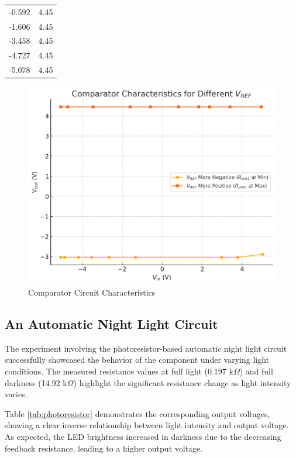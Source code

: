 \documentclass[12pt]{article}
\begin{document}
\begin{table}[H]
\begin{tabular}{|c|c|}
		-0.592       & 4.45                                                        \\
		-1.606       & 4.45                                                        \\
		-3.458       & 4.45                                                        \\
		-4.727       & 4.45                                                        \\
		-5.078       & 4.45                                                        \\
		\hline
	\end{tabular}
	\label{tab:comparator}
\end{table}

\begin{figure}[H]
	\centering
	\includegraphics[width=12cm]{03_exp2}
	\caption{Comparator Circuit Characteristics}
	\label{fig:exp2}
\end{figure}

\subsection{An Automatic Night Light Circuit}
The experiment involving the photoresistor-based automatic night light circuit successfully showcased the behavior of the component under varying light conditions. The measured resistance values at full light (0.197 k$\Omega$) and full darkness (14.92 k$\Omega$) highlight the significant resistance change as light intensity varies.

Table \ref{tab:photoresistor} demonstrates the corresponding output voltages, showing a clear inverse relationship between light intensity and output voltage. As expected, the LED brightness increased in darkness due to the decreasing feedback resistance, leading to a higher output voltage.
\end{document}
